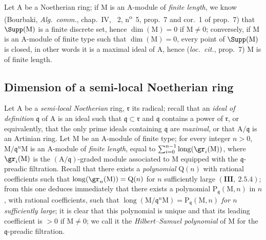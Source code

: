 \begin{env}[16.1.10]
\label{0.16.1.10}
Let $\mathrm{A}$ be a Noetherian ring; if $\mathrm{M}$ is an $\mathrm{A}$-module of \emph{finite length}, we know (Bourbaki, \emph{Alg.~comm.}, chap.~IV, \textsection~2, n\textsuperscript{o}~5, prop.~7 and cor.~1 of prop.~7) that $\Supp(\mathrm{M})$ is a finite discrete set, hence $\dim(\mathrm{M})=0$ if $\mathrm{M}\neq 0$; conversely, if $\mathrm{M}$ is an $\mathrm{A}$-module of finite type such that $\dim(\mathrm{M})=0$, every point of $\Supp(\mathrm{M})$ is closed, in other words it is a maximal ideal of $\mathrm{A}$, hence (\emph{loc.~cit.}, prop.~7) $\mathrm{M}$ is of finite length.
\end{env}

\subsection{Dimension of a semi-local Noetherian ring}
\label{subsection:0.16.2}

\begin{env}[16.2.1]
\label{0.16.2.1}
Let $\mathrm{A}$ be a \emph{semi-local Noetherian} ring, $\mathfrak{r}$ its radical; recall that an \emph{ideal of definition} $\mathfrak{q}$ of $\mathrm{A}$ is an ideal such that $\mathfrak{q}\subset\mathfrak{r}$ and $\mathfrak{q}$ contains a power of $\mathfrak{r}$, or equivalently, that the only prime ideals containing $\mathfrak{q}$ are \emph{maximal}, or that $\mathrm{A}/\mathfrak{q}$ is an Artinian ring.
Let $\mathrm{M}$ be an $\mathrm{A}$-module of finite type; for every integer $n>0$, $\mathrm{M}/\mathfrak{q}^n\mathrm{M}$ is an $\mathrm{A}$-module of \emph{finite length}, equal to $\sum_{i=0}^{n-1}\operatorname{long}(\gr_i(\mathrm{M}))$, where $\gr_i(\mathrm{M})$ is the $(\mathrm{A}/\mathfrak{q})$-graded module associated to $\mathrm{M}$ equipped with the $\mathfrak{q}$-preadic filtration.
Recall that there exists a \emph{polynomial} $\mathrm{Q}(n)$ with rational coefficients such that $\operatorname{long}(\gr_n(\mathrm{M}))=\mathrm{Q}(n)$ for $n$ sufficiently large $(\mathbf{III},~2.5.4)$; from this one deduces immediately that there exists a polynomial $\mathrm{P}_\mathfrak{q}(\mathrm{M},n)$ in $n$, with rational coefficients, such that $\operatorname{long}(\mathrm{M}/\mathfrak{q}^n\mathrm{M})=\mathrm{P}_\mathfrak{q}(\mathrm{M},n)$ \emph{for $n$ sufficiently large}; it is clear that this polynomial is unique and that its leading coefficient is $>0$ if $\mathrm{M}\neq 0$; we call it the \emph{Hilbert--Samuel polynomial} of $\mathrm{M}$ for the $\mathfrak{q}$-preadic filtration.
\end{env}

